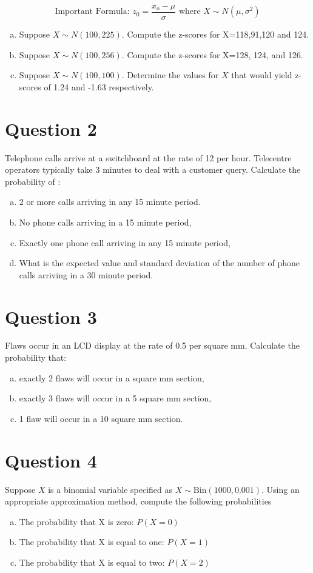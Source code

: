 

\[\mbox{Important Formula: } z_0 =  \frac{x_o - \mu }{ \sigma}  \mbox{ where } X \sim N(\mu,\sigma^2) \]
\begin{enumerate}[(a)]
\item Suppose $X \sim N(100,225)$. Compute the z-scores for X=118,91,120 and 124.
\item Suppose $X \sim N(100,256)$. Compute the z-scores for X=128, 124, and 126.
\item Suppose $X \sim N(100,100)$. Determine the values for $X$ that would yield z-scores of 1.24 and -1.63 respectively.
\end{enumerate}


\section*{Question 2}
Telephone calls arrive at a switchboard at the rate of 12 per hour.  Telecentre operators typically take 3 minutes to deal with a customer query.
Calculate the probability of :

\begin{enumerate}[(a)]
\item 2 or more calls arriving in any 15 minute period.
\item No phone calls arriving in a 15 minute period,
\item Exactly one phone call arriving in any 15 minute period,
\item What is the expected value and standard deviation of the number
of phone calls arriving in a 30 minute period.
\end{enumerate}


\section*{Question 3}
Flaws occur in an LCD display at the rate of 0.5 per square mm. Calculate the probability
that:
\begin{enumerate}[(a)]
    \item exactly 2 flaws will occur in a square mm section,
\item exactly 3 flaws will occur in a 5 square mm section,
\item 1 flaw will occur in a 10 square mm section.
\end{enumerate}


\section*{Question 4}
Suppose $X$ is a binomial variable specified as $X \sim \mbox{Bin}(1000,0.001)$. Using an appropriate approximation method, compute the following probabilities
\begin{enumerate}[(a)]
    \item The probability that X is zero: $P(X=0)$
\item The probability that X is equal to one:  $P(X=1)$
\item The probability that X is equal to two:  $P(X=2)$
\end{enumerate}


